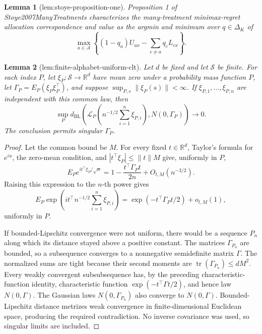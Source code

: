 \documentclass{article}
\newtheorem{lemma}{Lemma}
\begin{document}
\begin{lemma}[lem:stoye-proposition-one]\label{lem:stoye-proposition-one}
Proposition 1 of Stoye2007ManyTreatments characterizes the many-treatment minimax-regret allocation correspondence and value as the argmin and minimum over \(q\in\Delta_K\) of
\[
 \max_{a\in\mathcal A}\left\{(1-q_a)U_{ax}-\sum_{c\neq a}q_cL_{cx}\right\}.
\]
\end{lemma}

\begin{lemma}[lem:finite-alphabet-uniform-clt]\label{lem:finite-alphabet-uniform-clt}
Let \(d\) be fixed and let \(\mathcal S\) be finite.  For each index \(P\), let \(\xi_P:\mathcal S\to\mathbb R^d\) have mean zero under a probability mass function \(P\), let \(\Gamma_P=E_P(\xi_P\xi_P^\top)\), and suppose \(\sup_{P,s}\|\xi_P(s)\|<\infty\).  If \(\xi_{P,1},\ldots,\xi_{P,n}\) are independent with this common law, then
\[
 \sup_P d_{\mathrm{BL}}\left(\mathcal L_P\left(n^{-1/2}\sum_{i=1}^n\xi_{P,i}\right),N(0,\Gamma_P)\right)\longrightarrow0.
\]
The conclusion permits singular \(\Gamma_P\).
\end{lemma}
\begin{proof}
Let the common bound be \(M\).  For every fixed \(t\in\mathbb R^d\), Taylor's formula for \(e^{iu}\), the zero-mean condition, and \(|t^\top\xi_P|\leq\|t\|M\) give, uniformly in \(P\),
\[
 E_Pe^{it^\top\xi_P/\sqrt n}
 =1-\frac{t^\top\Gamma_Pt}{2n}+O_{t,M}(n^{-3/2}).
\]
Raising this expression to the \(n\)-th power gives
\[
 E_P\exp\left(it^\top n^{-1/2}\sum_{i=1}^n\xi_{P,i}\right)
 =\exp(-t^\top\Gamma_Pt/2)+o_{t,M}(1),
\]
uniformly in \(P\).

If bounded-Lipschitz convergence were not uniform, there would be a sequence \(P_n\) along which its distance stayed above a positive constant.  The matrices \(\Gamma_{P_n}\) are bounded, so a subsequence converges to a nonnegative semidefinite matrix \(\Gamma\).  The normalized sums are tight because their second moments are \(\operatorname{tr}(\Gamma_{P_n})\leq dM^2\).  Every weakly convergent subsubsequence has, by the preceding characteristic-function identity, characteristic function \(\exp(-t^\top\Gamma t/2)\), and hence law \(N(0,\Gamma)\).  The Gaussian laws \(N(0,\Gamma_{P_n})\) also converge to \(N(0,\Gamma)\).  Bounded-Lipschitz distance metrizes weak convergence in finite-dimensional Euclidean space, producing the required contradiction.  No inverse covariance was used, so singular limits are included.
\end{proof}
\end{document}
